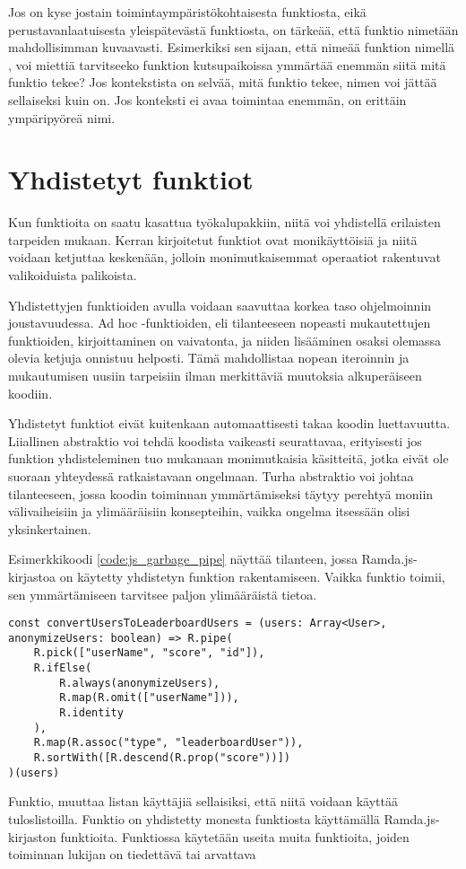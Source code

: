 Jos on kyse jostain toimintaympäristökohtaisesta funktiosta, eikä perustavanlaatuisesta yleispätevästä funktiosta, on tärkeää, että funktio nimetään mahdollisimman kuvaavasti. Esimerkiksi sen sijaan, että nimeää funktion nimellä , voi miettiä tarvitseeko funktion kutsupaikoissa ymmärtää enemmän siitä mitä funktio tekee? Jos kontekstista on selvää, mitä funktio tekee, nimen voi jättää sellaiseksi kuin on. Jos konteksti ei avaa toimintaa enemmän,  on erittäin ympäripyöreä nimi.

\section{Yhdistetyt funktiot}

Kun funktioita on saatu kasattua työkalupakkiin, niitä voi yhdistellä erilaisten tarpeiden mukaan. Kerran kirjoitetut funktiot ovat monikäyttöisiä ja niitä voidaan ketjuttaa keskenään, jolloin monimutkaisemmat operaatiot rakentuvat valikoiduista palikoista.

Yhdistettyjen funktioiden avulla voidaan saavuttaa korkea taso ohjelmoinnin joustavuudessa. Ad hoc -funktioiden, eli tilanteeseen nopeasti mukautettujen funktioiden, kirjoittaminen on vaivatonta, ja niiden lisääminen osaksi olemassa olevia ketjuja onnistuu helposti. Tämä mahdollistaa nopean iteroinnin ja mukautumisen uusiin tarpeisiin ilman merkittäviä muutoksia alkuperäiseen koodiin.

Yhdistetyt funktiot eivät kuitenkaan automaattisesti takaa koodin luettavuutta. Liiallinen abstraktio voi tehdä koodista vaikeasti seurattavaa, erityisesti jos funktion yhdisteleminen tuo mukanaan monimutkaisia käsitteitä, jotka eivät ole suoraan yhteydessä ratkaistavaan ongelmaan. Turha abstraktio voi johtaa tilanteeseen, jossa koodin toiminnan ymmärtämiseksi täytyy perehtyä moniin välivaiheisiin ja ylimääräisiin konsepteihin, vaikka ongelma itsessään olisi yksinkertainen.

Esimerkkikoodi \ref{code:js_garbage_pipe} näyttää tilanteen, jossa Ramda.js-kirjastoa on käytetty yhdistetyn funktion rakentamiseen. Vaikka funktio toimii, sen ymmärtämiseen tarvitsee paljon ylimääräistä tietoa.

\begin{code}
    \begin{verbatim}
const convertUsersToLeaderboardUsers = (users: Array<User>, anonymizeUsers: boolean) => R.pipe(
    R.pick(["userName", "score", "id"]),
    R.ifElse(
        R.always(anonymizeUsers), 
        R.map(R.omit(["userName"])), 
        R.identity
    ),
    R.map(R.assoc("type", "leaderboardUser")),
    R.sortWith([R.descend(R.prop("score"))])
)(users)
\end{verbatim}
    \caption{Funktio, muuttaa listan käyttäjiä sellaisiksi, että niitä voidaan käyttää tuloslistoilla. Funktio on yhdistetty monesta funktiosta käyttämällä Ramda.js-kirjaston funktioita. Funktiossa käytetään useita muita funktioita, joiden toiminnan lukijan on tiedettävä tai arvattava}
    \label{code:js_garbage_pipe}
\end{code}

